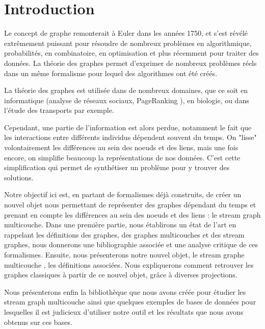 \documentclass[11pt,a4paper]{article}
\theoremstyle{definition}
\theoremstyle{remark}
\theoremstyle{remark}
\def \stgm {stream graph multicouche}
\begin{document}

\begin{abstract}

\end{abstract}

\newpage 

\tableofcontents
\newpage



\section*{Introduction}
	Le concept de graphe remonterait à Euler \cite{wikigraphes,divin} dans les années 1750, et s'est révélé extrêmement puissant pour résoudre de nombreux problèmes en algorithmique, probabilités, en combinatoire, en optimisation et plus récemment pour traiter des données.
	La théorie des graphes permet d'exprimer de nombreux problèmes réels dans un même formalisme pour lequel des algorithmes ont été créés.
	
	La théorie des graphes est utilisée dans de nombreux domaines, que ce soit en informatique (analyse de réseaux sociaux, PageRanking \cite{pr}), en biologie, ou dans l'étude des transports par exemple.
	
	Cependant, une partie de l'information est alors perdue, notamment le fait que les interactions entre différents individus dépendent souvent du temps. On "lisse" volontairement les différences au sein des noeuds et des liens, mais une fois encore, on simplifie beaucoup la représentations de nos données. C'est cette \og simplification \fg{}  qui permet de synthétiser un problème pour y trouver des solutions.
	
	Notre objectif ici est, en partant de formalismes déjà construits, de créer un nouvel objet nous permettant de représenter des graphes dépendant du temps et prenant en compte les différences au sein des noeuds et des liens : le \stgm. Dans une première partie, nous établirons un état de l'art en rappelant les définitions des graphes, des graphes multicouches et des stream graphes, nous donnerons une bibliographie associée et une analyse critique de ces formalismes. Ensuite, nous présenterons notre nouvel objet, le \og stream graphe multicouche \fg{} , les définitions associées. Nous expliquerons comment retrouver les graphes \og classiques\fg{} à partir de ce nouvel objet, grâce à diverses projections.
	
	Nous présenterons enfin la bibliothèque que nous avons créée pour étudier les stream graph multicouche ainsi que quelques exemples de bases de données pour lesquelles il est judicieux d'utiliser notre outil et les résultats que nous avons obtenus sur ces bases. 
	
\end{document}
